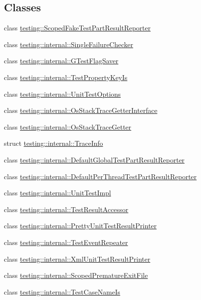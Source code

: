 \subsection*{Classes}
\begin{DoxyCompactItemize}
\item 
class \hyperlink{classtesting_1_1_scoped_fake_test_part_result_reporter}{testing\-::\-Scoped\-Fake\-Test\-Part\-Result\-Reporter}
\item 
class \hyperlink{classtesting_1_1internal_1_1_single_failure_checker}{testing\-::internal\-::\-Single\-Failure\-Checker}
\item 
class \hyperlink{classtesting_1_1internal_1_1_g_test_flag_saver}{testing\-::internal\-::\-G\-Test\-Flag\-Saver}
\item 
class \hyperlink{classtesting_1_1internal_1_1_test_property_key_is}{testing\-::internal\-::\-Test\-Property\-Key\-Is}
\item 
class \hyperlink{classtesting_1_1internal_1_1_unit_test_options}{testing\-::internal\-::\-Unit\-Test\-Options}
\item 
class \hyperlink{classtesting_1_1internal_1_1_os_stack_trace_getter_interface}{testing\-::internal\-::\-Os\-Stack\-Trace\-Getter\-Interface}
\item 
class \hyperlink{classtesting_1_1internal_1_1_os_stack_trace_getter}{testing\-::internal\-::\-Os\-Stack\-Trace\-Getter}
\item 
struct \hyperlink{structtesting_1_1internal_1_1_trace_info}{testing\-::internal\-::\-Trace\-Info}
\item 
class \hyperlink{classtesting_1_1internal_1_1_default_global_test_part_result_reporter}{testing\-::internal\-::\-Default\-Global\-Test\-Part\-Result\-Reporter}
\item 
class \hyperlink{classtesting_1_1internal_1_1_default_per_thread_test_part_result_reporter}{testing\-::internal\-::\-Default\-Per\-Thread\-Test\-Part\-Result\-Reporter}
\item 
class \hyperlink{classtesting_1_1internal_1_1_unit_test_impl}{testing\-::internal\-::\-Unit\-Test\-Impl}
\item 
class \hyperlink{classtesting_1_1internal_1_1_test_result_accessor}{testing\-::internal\-::\-Test\-Result\-Accessor}
\item 
class \hyperlink{classtesting_1_1internal_1_1_pretty_unit_test_result_printer}{testing\-::internal\-::\-Pretty\-Unit\-Test\-Result\-Printer}
\item 
class \hyperlink{classtesting_1_1internal_1_1_test_event_repeater}{testing\-::internal\-::\-Test\-Event\-Repeater}
\item 
class \hyperlink{classtesting_1_1internal_1_1_xml_unit_test_result_printer}{testing\-::internal\-::\-Xml\-Unit\-Test\-Result\-Printer}
\item 
class \hyperlink{classtesting_1_1internal_1_1_scoped_premature_exit_file}{testing\-::internal\-::\-Scoped\-Premature\-Exit\-File}
\item 
class \hyperlink{classtesting_1_1internal_1_1_test_case_name_is}{testing\-::internal\-::\-Test\-Case\-Name\-Is}
\end{DoxyCompactItemize}
